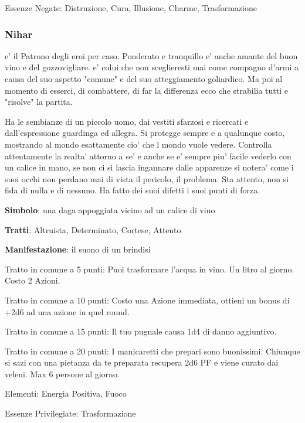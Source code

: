 \documentclass[a4paper,11pt,twoside,openany]{book}
\begin{document}
{Essenze Negate: Distruzione, Cura, Illusione, Charme, Trasformazione

\subsubsection{Nihar}

\label{nihar}

e' il Patrono degli eroi per caso. Ponderato e tranquillo e' anche amante del buon vino e del gozzovigliare. e' colui che non sceglieresti mai come compagno d'armi a causa del suo aspetto "comune" e del suo atteggiamento goliardico. Ma poi al momento di esserci, di combattere, di far la differenza ecco che strabilia tutti e "risolve" la partita.

Ha le sembianze di un piccolo uomo, dai vestiti sfarzosi e ricercati e dall'espressione guardinga ed allegra. Si protegge sempre e a qualunque costo, mostrando al mondo esattamente cio' che l mondo vuole vedere. Controlla attentamente la realta' attorno a se' e anche se e' sempre piu' facile vederlo con un calice in mano, se non ci si lascia ingannare dalle apparenze si notera' come i suoi occhi non perdano mai di vista il pericolo, il problema. Sta attento, non si fida di nulla e di nessuno. Ha fatto dei suoi difetti i suoi punti di forza.

\textbf{Simbolo}: una daga appoggiata vicino ad un calice di vino

\textbf{Tratti}: Altruista, Determinato, Cortese, Attento

\textbf{Manifestazione}: il suono di un brindisi

\bigskip

Tratto in comune a 5 punti: Puoi trasformare l'acqua in vino. Un litro al giorno. Costo 2 Azioni.

Tratto in comune a 10 punti: Costo una Azione immediata, ottieni un bonus di +2d6 ad una azione in quel round.

Tratto in comune a 15 punti: Il tuo pugnale causa 1d4 di danno aggiuntivo.

Tratto in comune a 20 punti: I manicaretti che prepari sono buonissimi. Chiunque si sazi con una pietanza da te preparata recupera 2d6 PF e viene curato dai veleni. Max 6 persone al giorno.

\bigskip

Elementi: Energia Positiva, Fuoco

\bigskip

Essenze Privilegiate: Trasformazione

}
\end{document}
